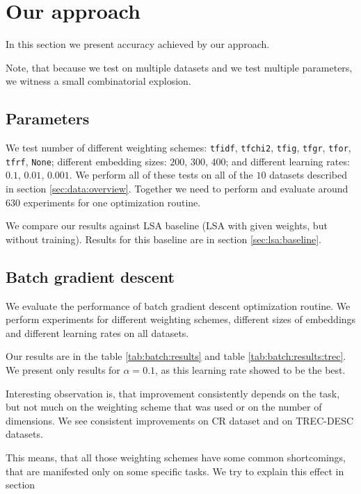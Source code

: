 \section{Our approach}
    
    In this section we present accuracy achieved by our approach.
    
    Note, that because we test on multiple datasets and we test multiple parameters, we witness a small combinatorial explosion.

    \subsection{Parameters}
    \* %
    We test number of different weighting schemes: \texttt{tfidf}, \texttt{tfchi2}, \texttt{tfig}, \texttt{tfgr}, \texttt{tfor}, \texttt{tfrf}, \texttt{None};
    different embedding sizes: $200$, $300$, $400$;
    and different learning rates: $0.1$, $0.01$, $0.001$.
    We perform all of these tests on all of the $10$ datasets described in section \ref{sec:data:overview}.
    Together we need to perform and evaluate around $630$ experiments for one optimization routine.
    
    We compare our results against LSA baseline (LSA with given weights, but without training).
    Results for this baseline are in section \ref{sec:lsa:baseline}.
    
    \subsection{Batch gradient descent}
    We evaluate the performance of batch gradient descent optimization routine.
    We perform experiments for different weighting schemes, different sizes of embeddings and different learning rates on all datasets.

    Our results are in the table \ref{tab:batch:results} and table \ref{tab:batch:results:trec}.
    We present only results for $\alpha=0.1$, as this learning rate showed to be the best. 
        
    

    Interesting observation is, that improvement consistently depends on the task, 
    but not much on the weighting scheme that was used or on the number of dimensions.
    We see consistent improvements on CR dataset and on TREC-DESC datasets.

    This means, that all those weighting schemes have some common shortcomings, 
    that are manifested only on some specific tasks.  
    We try to explain this effect in section\* %
    

